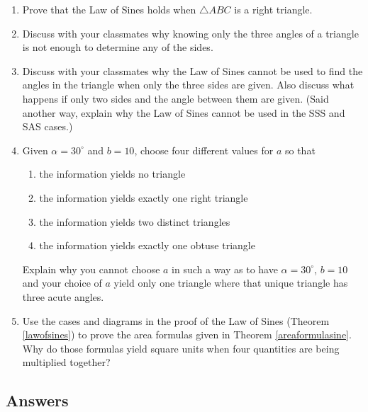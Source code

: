 \documentclass{ximera}
\begin{document}
\begin{enumerate}
\setcounter{enumi}{\value{HW}}

\item Prove that the Law of Sines holds when $\triangle ABC$ is a right triangle.

\item Discuss with your classmates why knowing only the three angles of a triangle is not enough to determine any of the sides.

\item Discuss with your classmates why the Law of Sines cannot be used to find the angles in the triangle when only the three sides are given.  Also discuss what happens if only two sides and the angle between them are given.  (Said another way, explain why the Law of Sines cannot be used in the SSS and SAS cases.)

\item Given $\alpha = 30^{\circ}$ and $b = 10$, choose four different values for $a$ so that 

\begin{enumerate}

\item the information yields no triangle
\item the information yields exactly one right triangle
\item the information yields two distinct triangles
\item the information yields exactly one obtuse triangle

\end{enumerate}

Explain why you cannot choose $a$ in such a way as to have $\alpha = 30^{\circ}$, $b = 10$ and your choice of $a$ yield only one triangle where that unique triangle has three acute angles.

\item Use the cases and diagrams in the proof of the Law of Sines (Theorem \ref{lawofsines}) to prove the area formulas given in Theorem \ref{areaformulasine}.  Why do those formulas yield square units when four quantities are being multiplied together?

\setcounter{HW}{\value{enumi}}

\end{enumerate}

\newpage

\subsection{Answers}
\end{document}
